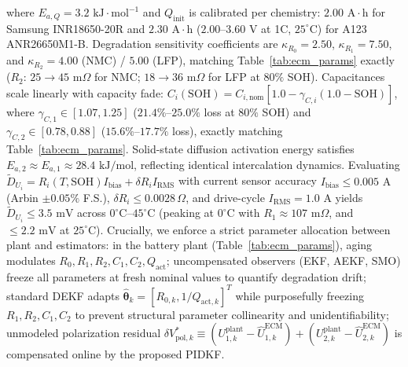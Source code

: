 \documentclass[balance,nocopyright,upint,varvw,hyphenate,barcolor=NavyBlue,nolists]{asmejour}
\begin{document}
where $E_{a,Q} = 3.2\text{ kJ}\cdot\text{mol}^{-1}$ and $Q_{\text{init}}$ is calibrated per chemistry: $2.00\text{ A}\cdot\text{h}$ for Samsung INR18650-20R and $2.30\text{ A}\cdot\text{h}$ ($2.00\text{--}3.60\text{ V}$ at 1C, $25^\circ\text{C}$) for A123 ANR26650M1-B. Degradation sensitivity coefficients are $\kappa_{R_0} = 2.50$, $\kappa_{R_1} = 7.50$, and $\kappa_{R_2} = 4.00$ (NMC) / $5.00$ (LFP), matching Table~\ref{tab:ecm_params} exactly ($R_2$: $25 \to 45\text{ m}\Omega$ for NMC; $18 \to 36\text{ m}\Omega$ for LFP at $80\%$ SOH). Capacitances scale linearly with capacity fade: $C_i(\text{SOH}) = C_{i,\text{nom}} [1.0 - \gamma_{C,i} (1.0 - \text{SOH})]$, where $\gamma_{C,1} \in [1.07, 1.25]$ ($21.4\%\text{--}25.0\%$ loss at $80\%$ SOH) and $\gamma_{C,2} \in [0.78, 0.88]$ ($15.6\%\text{--}17.7\%$ loss), exactly matching Table~\ref{tab:ecm_params}. Solid-state diffusion activation energy satisfies $E_{a,2} \approx E_{a,1} \approx 28.4\text{ kJ/mol}$, reflecting identical intercalation dynamics. Evaluating $\tilde{D}_{U_i} = R_i(T,\text{SOH}) I_{\text{bias}} + \delta R_i I_{\text{RMS}}$ with current sensor accuracy $I_{\text{bias}} \le 0.005\text{ A}$ (Arbin $\pm 0.05\%$ F.S.), $\delta R_i \le 0.0028\,\Omega$, and drive-cycle $I_{\text{RMS}} = 1.0\text{ A}$ yields $\tilde{D}_{U_i} \le 3.5\text{ mV}$ across $0^\circ\text{C}\text{--}45^\circ\text{C}$ (peaking at $0^\circ\text{C}$ with $R_1 \approx 107\text{ m}\Omega$, and $\le 2.2\text{ mV}$ at $25^\circ\text{C}$). Crucially, we enforce a strict parameter allocation between plant and estimators: in the battery plant (Table~\ref{tab:ecm_params}), aging modulates $R_0, R_1, R_2, C_1, C_2, Q_{\text{act}}$; uncompensated observers (EKF, AEKF, SMO) freeze all parameters at fresh nominal values to quantify degradation drift; standard DEKF adapts $\hat{\boldsymbol{\theta}}_k = [R_{0,k}, 1/Q_{\text{act},k}]^T$ while purposefully freezing $R_1, R_2, C_1, C_2$ to prevent structural parameter collinearity and unidentifiability; unmodeled polarization residual $\delta V_{\text{pol},k}^* \equiv (U_{1,k}^{\text{plant}} - \hat{U}_{1,k}^{\text{ECM}}) + (U_{2,k}^{\text{plant}} - \hat{U}_{2,k}^{\text{ECM}})$ is compensated online by the proposed PIDKF.
\end{document}
